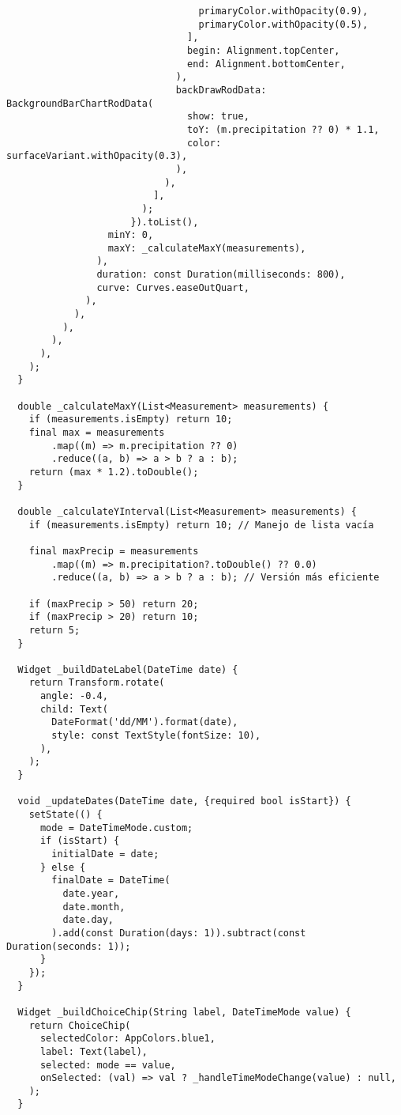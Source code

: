 \begin{verbatim}
                                  primaryColor.withOpacity(0.9),
                                  primaryColor.withOpacity(0.5),
                                ],
                                begin: Alignment.topCenter,
                                end: Alignment.bottomCenter,
                              ),
                              backDrawRodData: BackgroundBarChartRodData(
                                show: true,
                                toY: (m.precipitation ?? 0) * 1.1,
                                color: surfaceVariant.withOpacity(0.3),
                              ),
                            ),
                          ],
                        );
                      }).toList(),
                  minY: 0,
                  maxY: _calculateMaxY(measurements),
                ),
                duration: const Duration(milliseconds: 800),
                curve: Curves.easeOutQuart,
              ),
            ),
          ),
        ),
      ),
    );
  }

  double _calculateMaxY(List<Measurement> measurements) {
    if (measurements.isEmpty) return 10;
    final max = measurements
        .map((m) => m.precipitation ?? 0)
        .reduce((a, b) => a > b ? a : b);
    return (max * 1.2).toDouble();
  }

  double _calculateYInterval(List<Measurement> measurements) {
    if (measurements.isEmpty) return 10; // Manejo de lista vacía

    final maxPrecip = measurements
        .map((m) => m.precipitation?.toDouble() ?? 0.0)
        .reduce((a, b) => a > b ? a : b); // Versión más eficiente

    if (maxPrecip > 50) return 20;
    if (maxPrecip > 20) return 10;
    return 5;
  }

  Widget _buildDateLabel(DateTime date) {
    return Transform.rotate(
      angle: -0.4,
      child: Text(
        DateFormat('dd/MM').format(date),
        style: const TextStyle(fontSize: 10),
      ),
    );
  }

  void _updateDates(DateTime date, {required bool isStart}) {
    setState(() {
      mode = DateTimeMode.custom;
      if (isStart) {
        initialDate = date;
      } else {
        finalDate = DateTime(
          date.year,
          date.month,
          date.day,
        ).add(const Duration(days: 1)).subtract(const Duration(seconds: 1));
      }
    });
  }

  Widget _buildChoiceChip(String label, DateTimeMode value) {
    return ChoiceChip(
      selectedColor: AppColors.blue1,
      label: Text(label),
      selected: mode == value,
      onSelected: (val) => val ? _handleTimeModeChange(value) : null,
    );
  }


\end{verbatim}
